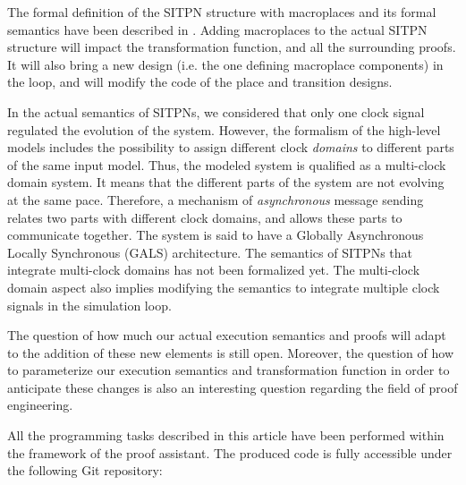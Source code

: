 \documentclass[pdflatex,sn-mathphys]{sn-jnl}%
\theoremstyle{thmstyleone}%
\theoremstyle{thmstyletwo}%
\theoremstyle{thmstylethree}%
\begin{document}
The formal definition of the SITPN structure with macroplaces and its
formal semantics have been described in \cite{Leroux2014}. Adding
macroplaces to the actual SITPN structure will impact the
transformation function, and all the surrounding proofs. It will also
bring a new \hvhdl{} design (i.e. the one defining macroplace
components) in the loop, and will modify the code of the place and
transition designs.

In the actual semantics of SITPNs, we considered that only one clock
signal regulated the evolution of the system. However, the formalism
of the \hilecop{} high-level models includes the possibility to assign
different clock \textit{domains} to different parts of the same input
model. Thus, the modeled system is qualified as a multi-clock domain
system. It means that the different parts of the system are not
evolving at the same pace. Therefore, a mechanism of
\textit{asynchronous} message sending relates two parts with different
clock domains, and allows these parts to communicate together. The
system is said to have a Globally Asynchronous Locally Synchronous
(GALS) architecture.  The semantics of SITPNs that integrate
multi-clock domains has not been formalized yet. The multi-clock
domain aspect also implies modifying the \hvhdl{} semantics to
integrate multiple clock signals in the simulation loop.


The question of how much our actual execution semantics and proofs
will adapt to the addition of these new elements is still
open. Moreover, the question of how to parameterize our execution
semantics and transformation function in order to anticipate these
changes is also an interesting question regarding the field of proof
engineering.

All the programming tasks described in this article have been
performed within the framework of the \coq{} proof assistant. The
produced code is fully accessible under the following \textsf{Git}
repository:
\end{document}
